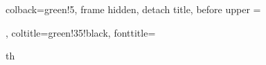 \usepackage{enumerate}
\usepackage{framed}
\usepackage{amsmath,amsfonts,amsthm,thmtools,amssymb,mathtools,commath}
\usepackage{tikz}
\usepackage{xcolor}
\usepackage[most]{tcolorbox}


%
{
    colback=green!5,
    frame hidden,
    detach title,
    before upper = \tcbtitle\par\smallskip,
    coltitle=green!35!black,
    fonttitle=\bfseries\sffamily
}{th}
